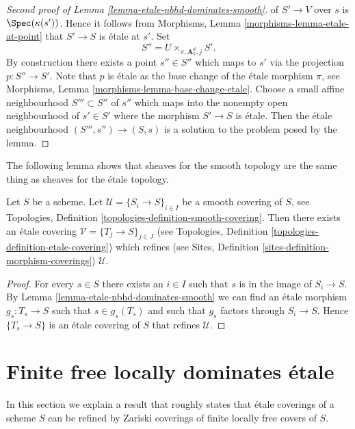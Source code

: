\begin{proof}[Second proof of Lemma \ref{lemma-etale-nbhd-dominates-smooth}]
of $S' \to V$ over $s$ is $\Spec(\kappa(s'))$. Hence it follows from
Morphisms, Lemma \ref{morphisms-lemma-etale-at-point}
that $S' \to S$ is \'etale at $s'$. Set
$$
S'' = U \times_{\pi, \mathbf{A}^d_V, j} S'.
$$
By construction there exists a point $s'' \in S''$ which maps to
$s'$ via the projection $p : S'' \to S'$. Note that $p$ is \'etale
as the base change of the \'etale morphism $\pi$, see
Morphisms, Lemma \ref{morphisms-lemma-base-change-etale}.
Choose a small affine neighbourhood $S''' \subset S''$ of $s''$
which maps into the nonempty open neighbourhood of $s' \in S'$
where the morphism $S' \to S$ is \'etale. Then the \'etale neighbourhood
$(S''', s'') \to (S, s)$ is a solution to the problem posed by the lemma.
\end{proof}

\noindent
The following lemma shows that sheaves for the smooth topology are
the same thing as sheaves for the \'etale topology.

\begin{lemma}
\label{lemma-etale-dominates-smooth}
Let $S$ be a scheme. Let $\mathcal{U} = \{S_i \to S\}_{i \in I}$ be a smooth
covering of $S$, see
Topologies, Definition \ref{topologies-definition-smooth-covering}.
Then there exists an \'etale covering $\mathcal{V} = \{T_j \to S\}_{j \in J}$
(see
Topologies, Definition \ref{topologies-definition-etale-covering})
which refines (see
Sites, Definition \ref{sites-definition-morphism-coverings})
$\mathcal{U}$.
\end{lemma}

\begin{proof}
For every $s \in S$ there exists an $i \in I$ such that $s$ is in
the image of $S_i \to S$. By
Lemma \ref{lemma-etale-nbhd-dominates-smooth}
we can find an \'etale morphism $g_s : T_s \to S$ such that $s \in g_s(T_s)$
and such that $g_s$ factors through $S_i \to S$. Hence
$\{T_s \to S\}$ is an \'etale covering of $S$ that refines $\mathcal{U}$.
\end{proof}




\section{Finite free locally dominates \'etale}
\label{section-finite-free-over-etale}

\noindent
In this section we explain a result that roughly states that
\'etale coverings of a scheme $S$ can be refined by Zariski coverings
of finite locally free covers of $S$.


